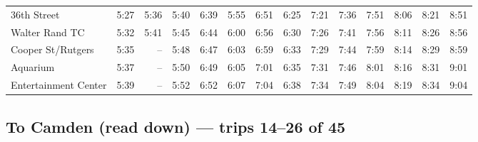 \begin{center}
\begin{tabular}{@{}lrrrrrrrrrrrrr@{}}
36th Street & 5:27 & 5:36 & 5:40 & 6:39 & 5:55 & 6:51 & 6:25 & 7:21 & 7:36 & 7:51 & 8:06 & 8:21 & 8:51 \\
Walter Rand TC & 5:32 & 5:41 & 5:45 & 6:44 & 6:00 & 6:56 & 6:30 & 7:26 & 7:41 & 7:56 & 8:11 & 8:26 & 8:56 \\
Cooper St/Rutgers & 5:35 & -- & 5:48 & 6:47 & 6:03 & 6:59 & 6:33 & 7:29 & 7:44 & 7:59 & 8:14 & 8:29 & 8:59 \\
Aquarium & 5:37 & -- & 5:50 & 6:49 & 6:05 & 7:01 & 6:35 & 7:31 & 7:46 & 8:01 & 8:16 & 8:31 & 9:01 \\
Entertainment Center & 5:39 & -- & 5:52 & 6:52 & 6:07 & 7:04 & 6:38 & 7:34 & 7:49 & 8:04 & 8:19 & 8:34 & 9:04 \\
\bottomrule\end{tabular}\end{center}
\subsection*{To Camden (read down) --- trips 14--26 of 45}
